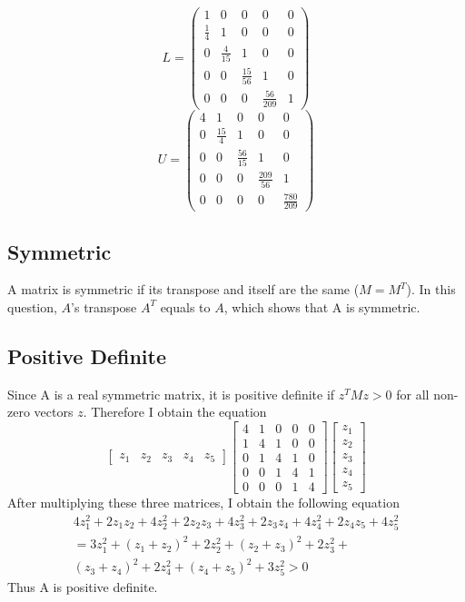 \documentclass[11pt]{article}
\begin{document}
	\begin{equation}L = \left(\begin{array}{ccccc}
		1 & 0 & 0 & 0 & 0\\
		\frac{1}{4} & 1 & 0 & 0 & 0\\
		0 & \frac{4}{15} & 1 & 0 & 0\\
		0 & 0 & \frac{15}{56} & 1 & 0\\
		0 & 0 & 0 & \frac{56}{209} & 1
	\end{array}\right)\end{equation}
	\begin{equation}U = \left(\begin{array}{ccccc}
		4 & 1 & 0 & 0 & 0\\
		0 & \frac{15}{4} & 1 & 0 & 0\\
		0 & 0 & \frac{56}{15} & 1 & 0\\
		0 & 0 & 0 & \frac{209}{56} & 1\\
		0 & 0 & 0 & 0 & \frac{780}{209}
	\end{array}\right)\end{equation}
	\subsection{Symmetric}
	A matrix is symmetric if its transpose and itself are the same (\(M = M^T\)). In this question, \(A\)'s transpose \(A^T\) equals to \(A\), which shows that A is symmetric.
	\subsection{Positive Definite}
	Since A is a real symmetric matrix, it is positive definite if \(z^TMz > 0\) for all non-zero vectors \(z\). Therefore I obtain the equation
	\begin{equation}
		\left[\begin{array}{ccccc}z_1&z_2&z_3&z_4&z_5\end{array}\right]		\left[\begin{array}{ccccc}4&1&0&0&0\\1&4&1&0&0\\0&1&4&1&0\\0&0&1&4&1\\0&0&0&1&4\end{array}\right]
		\left[\begin{array}{c}z_1\\z_2\\z_3\\z_4\\z_5\end{array}\right]
	\end{equation}
	After multiplying these three matrices, I obtain the following equation\begin{equation}\begin{aligned}4z_1^2 + 2z_1z_2 + 4z_2^2 + 2z_2z_3 + 4z_3^2 + 2z_3z_4 + 4z_4^2 + 2z_4z_5 + 4z_5^2\\= 3z_1^2 + (z_1 + z_2)^2 + 2z_2^2 + (z_2 + z_3)^2 + 2z_3^2 + \\(z_3 + z_4)^2 + 2z_4^2 + (z_4 + z_5)^2 + 3z_5^2 > 0\end{aligned}\end{equation}Thus A is positive definite.
\end{document}
